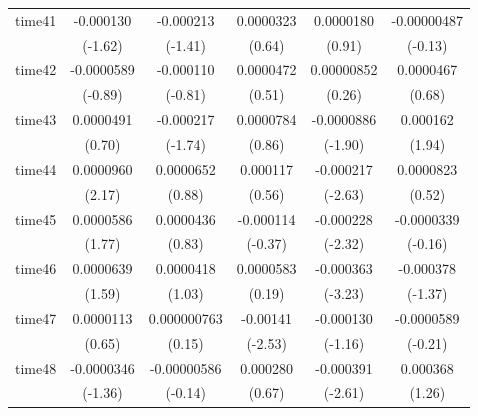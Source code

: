 \begin{table}[htbp]
\begin{tabular}{l*{5}{c}}
time41      &   -0.000130         &   -0.000213         &   0.0000323         &   0.0000180         & -0.00000487         \\
            &     (-1.62)         &     (-1.41)         &      (0.64)         &      (0.91)         &     (-0.13)         \\
time42      &  -0.0000589         &   -0.000110         &   0.0000472         &  0.00000852         &   0.0000467         \\
            &     (-0.89)         &     (-0.81)         &      (0.51)         &      (0.26)         &      (0.68)         \\
time43      &   0.0000491         &   -0.000217         &   0.0000784         &  -0.0000886         &    0.000162         \\
            &      (0.70)         &     (-1.74)         &      (0.86)         &     (-1.90)         &      (1.94)         \\
time44      &   0.0000960\sym{*}  &   0.0000652         &    0.000117         &   -0.000217\sym{**} &   0.0000823         \\
            &      (2.17)         &      (0.88)         &      (0.56)         &     (-2.63)         &      (0.52)         \\
time45      &   0.0000586         &   0.0000436         &   -0.000114         &   -0.000228\sym{*}  &  -0.0000339         \\
            &      (1.77)         &      (0.83)         &     (-0.37)         &     (-2.32)         &     (-0.16)         \\
time46      &   0.0000639         &   0.0000418         &   0.0000583         &   -0.000363\sym{**} &   -0.000378         \\
            &      (1.59)         &      (1.03)         &      (0.19)         &     (-3.23)         &     (-1.37)         \\
time47      &   0.0000113         & 0.000000763         &    -0.00141\sym{*}  &   -0.000130         &  -0.0000589         \\
            &      (0.65)         &      (0.15)         &     (-2.53)         &     (-1.16)         &     (-0.21)         \\
time48      &  -0.0000346         & -0.00000586         &    0.000280         &   -0.000391\sym{**} &    0.000368         \\
            &     (-1.36)         &     (-0.14)         &      (0.67)         &     (-2.61)         &      (1.26)         \\

\end{tabular}
\end{table}
